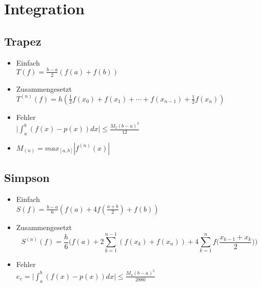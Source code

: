 \section{Integration}

\subsection{Trapez}
\begin{itemize}
	\item Einfach \\
	$T(f) = \frac{b-a}{2} (f(a) + f(b))$
	
	\item Zusammengesetzt \\
	$T^{(n)}(f) = h (\frac{1}{2} f(x_0) + f(x_1) + \cdots + f(x_{n-1}) + \frac{1}{2} f(x_n))$
	
	\item Fehler \\
	$\bigg|\int_a^b (f(x)-p(x)) dx \bigg| \leq \frac{M_2(b-a)^3}{12}$

	\item $M_{(n)} = max_{[a,b]}|f^{(n)}(x)|$
	
\end{itemize}

\subsection{Simpson}
\begin{itemize}
	\item Einfach \\
	$S(f) = \frac{b-a}{6} (f(a) + 4 f(\frac{a+b}{2}) + f(b))$
	
	\item Zusammengesetzt \\
	\begin{equation*}
		S^{(n)}(f) = \frac{h}{6} \bigg(f(a) + 2 \sum_{k=1}^{n-1}(f(x_k)+f(x_n)) + 4 \sum_{k=1}^nf\big(\frac{x_{k-1}+x_k}{2}\big)\bigg)
	\end{equation*}
	
	\item Fehler \\
	$e_v = \bigg|\int_a^b (f(x)-p(x)) dx \bigg| \leq \frac{M_4(b-a)^5}{2880}$
\end{itemize}

